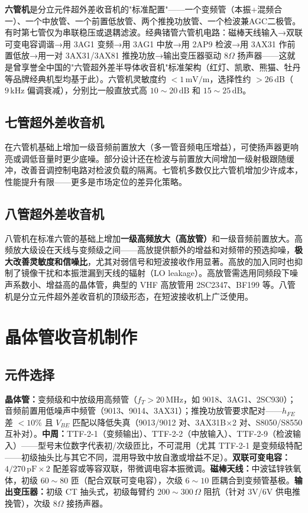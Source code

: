 \documentclass[12pt,UTF8]{ctexbook}
\begin{document}
\textbf{六管机}是分立元件超外差收音机的"标准配置"——一个变频管（本振+混频合一）、一个中放管、一个前置低放管、两个推挽功放管、一个检波兼AGC二极管。有时第七管仅为串联稳压或退耦滤波。经典锗管六管机电路：磁棒天线输入→双联可变电容调谐→用 3AG1 变频→用 3AG1 中放→用 2AP9 检波→用 3AX31 作前置低放→用一对 3AX31/3AX81 推挽功放→输出变压器驱动 $8\Omega$ 扬声器——这就是曾享誉全中国的"六管超外差半导体收音机"标准架构（红灯、凯歌、熊猫、牡丹等品牌经典机型均基于此）。六管机灵敏度约 $<1\,\mathrm{mV/m}$，选择性约 $>26\,\mathrm{dB}$（$9\,\mathrm{kHz}$ 偏调衰减），分别比一般直放式高 $10\sim20\,\mathrm{dB}$ 和 $15\sim25\,\mathrm{dB}$。

\subsection{七管超外差收音机}

在六管机基础上增加一级音频前置放大（多一管音频电压增益），可使扬声器更响亮或调低音量时更少底噪。部分设计还在检波与前置放大间增加一级射极跟随缓冲，改善音调控制电路对检波负载的隔离。七管机多数仅比六管机增加少许成本，性能提升有限——更多是市场定位的差异化策略。

\subsection{八管超外差收音机}

八管机在标准六管的基础上增加\textbf{一级高频放大（高放管）}和一级音频前置放大。高频放大级设在天线与变频级之间——高放提供额外的增益和对频带的预选抑噪，\textbf{极大改善灵敏度和信噪比}，尤其对弱信号和短波接收作用显著。高放的加入同时也抑制了镜像干扰和本振泄漏到天线的辐射（LO leakage）。高放管需选用同频段下噪声系数小、增益高的晶体管，典型的 VHF 高放管用 2SC2347、BF199 等。八管机是分立元件超外差收音机的顶级形态，在短波接收机上广泛使用。

\section{晶体管收音机制作}
\label{sec:transistor_radio_building}

\subsection{元件选择}

\textbf{晶体管：}变频级和中放级用高频管（$f_T>20\,\mathrm{MHz}$，如 9018、3AG1、2SC930）；音频前置用低噪声中频管（9013、9014、3AX31）；推挽功放管要求配对——$h_{FE}$ 差 $<10\%$ 且 $V_{BE}$ 匹配以降低失真（9013/9012 对、3AX31B×2 对、S8050/S8550 互补对）。\textbf{中周：}TTF-2-1（变频输出）、TTF-2-2（中放输入）、TTF-2-9（检波输入）——型号末位数字代表初/次级匝比，不可混用（尤其 TTF-2-1 是变频级特配——初级抽头比与其它不同，混用导致中放自激或增益不足）。\textbf{双联可变电容：}$4/270\,\mathrm{pF}\times2$ 配差容或等容双联，带微调电容本振微调。\textbf{磁棒天线：}中波锰锌铁氧体，初级 $60\sim80$ 匝（配合双联可变电容），次级 $6\sim10$ 匝耦合到变频管基极。\textbf{输出变压器：}初级 CT 抽头式，初级每臂约 $200\sim300\,\Omega$ 阻抗（针对 3V/6V 供电推挽管），次级 $8\Omega$ 接扬声器。
\end{document}
